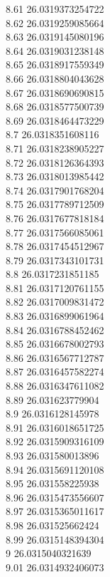 {8.61	26.0319373254722\\
8.62	26.0319259085664\\
8.63	26.0319145080196\\
8.64	26.0319031238148\\
8.65	26.0318917559349\\
8.66	26.0318804043628\\
8.67	26.0318690690815\\
8.68	26.0318577500739\\
8.69	26.0318464473229\\
8.7	26.0318351608116\\
8.71	26.0318238905227\\
8.72	26.0318126364393\\
8.73	26.0318013985442\\
8.74	26.0317901768204\\
8.75	26.0317789712509\\
8.76	26.0317677818184\\
8.77	26.0317566085061\\
8.78	26.0317454512967\\
8.79	26.0317343101731\\
8.8	26.0317231851185\\
8.81	26.0317120761155\\
8.82	26.0317009831472\\
8.83	26.0316899061964\\
8.84	26.0316788452462\\
8.85	26.0316678002793\\
8.86	26.0316567712787\\
8.87	26.0316457582274\\
8.88	26.0316347611082\\
8.89	26.031623779904\\
8.9	26.0316128145978\\
8.91	26.0316018651725\\
8.92	26.0315909316109\\
8.93	26.031580013896\\
8.94	26.0315691120108\\
8.95	26.031558225938\\
8.96	26.0315473556607\\
8.97	26.0315365011617\\
8.98	26.031525662424\\
8.99	26.0315148394304\\
9	26.0315040321639\\
9.01	26.0314932406073\\
}
